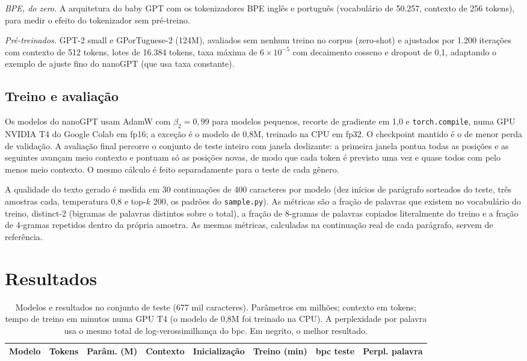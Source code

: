 \documentclass[conference]{IEEEtran}
\begin{document}
\emph{BPE, do zero.} A arquitetura do baby GPT com os tokenizadores BPE inglês e português (vocabulário de 50.257, contexto de 256 tokens), para medir o efeito do tokenizador sem pré-treino.

\emph{Pré-treinados.} GPT-2 small e GPorTuguese-2 (124M), avaliados sem nenhum treino no corpus (zero-shot) e ajustados por 1.200 iterações com contexto de 512 tokens, lotes de 16.384 tokens, taxa máxima de $6\times10^{-5}$ com decaimento cosseno e dropout de 0,1, adaptando o exemplo de ajuste fino do nanoGPT (que usa taxa constante).

\subsection{Treino e avaliação}

Os modelos do nanoGPT usam AdamW com $\beta_2=0{,}99$ para modelos pequenos, recorte de gradiente em 1,0 e \texttt{torch.compile}, numa GPU NVIDIA T4 do Google Colab em fp16; a exceção é o modelo de 0,8M, treinado na CPU em fp32. O checkpoint mantido é o de menor perda de validação. A avaliação final percorre o conjunto de teste inteiro com janela deslizante: a primeira janela pontua todas as posições e as seguintes avançam meio contexto e pontuam só as posições novas, de modo que cada token é previsto uma vez e quase todos com pelo menos meio contexto. O mesmo cálculo é feito separadamente para o teste de cada gênero.

A qualidade do texto gerado é medida em 30 continuações de 400 caracteres por modelo (dez inícios de parágrafo sorteados do teste, três amostras cada, temperatura 0,8 e top-$k$ 200, os padrões do \texttt{sample.py}). As métricas são a fração de palavras que existem no vocabulário do treino, distinct-2 (bigramas de palavras distintos sobre o total), a fração de 8-gramas de palavras copiados literalmente do treino e a fração de 4-gramas repetidos dentro da própria amostra. As mesmas métricas, calculadas na continuação real de cada parágrafo, servem de referência.

\section{Resultados}

\begin{table}[t]
\centering
\caption{Modelos e resultados no conjunto de teste (677 mil caracteres). Parâmetros em milhões; contexto em tokens; tempo de treino em minutos numa GPU T4 (o modelo de 0,8M foi treinado na CPU). A perplexidade por palavra usa o mesmo total de log-verossimilhança do bpc. Em negrito, o melhor resultado.}
\label{tab:resultados}
\footnotesize
\begin{tabular}{lccccccc}
\toprule
Modelo & Tokens & Parâm. (M) & Contexto & Inicialização & Treino (min) & bpc teste & Perpl. palavra \\
\midrule

\end{tabular}
\end{table}
\end{document}
